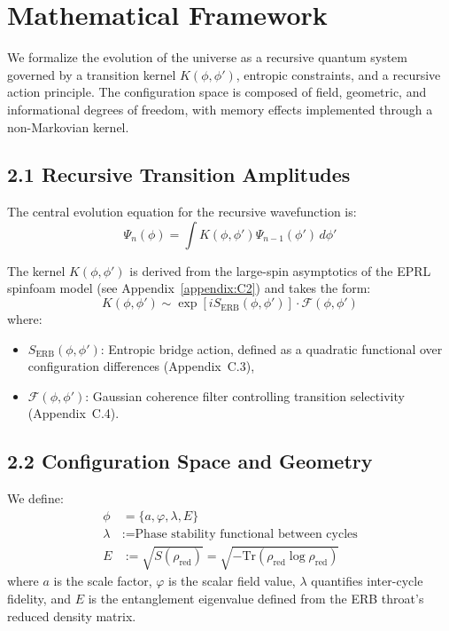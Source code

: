 \section{Mathematical Framework}
\label{sec:mathematical-framework}

We formalize the evolution of the universe as a recursive quantum system governed by a transition kernel \( K(\phi, \phi') \), entropic constraints, and a recursive action principle. The configuration space is composed of field, geometric, and informational degrees of freedom, with memory effects implemented through a non-Markovian kernel.

\subsection{2.1 Recursive Transition Amplitudes}

The central evolution equation for the recursive wavefunction is:
\begin{equation}
\Psi_n(\phi) = \int K(\phi, \phi') \Psi_{n-1}(\phi') \, d\phi'
\end{equation}

The kernel \( K(\phi, \phi') \) is derived from the large-spin asymptotics of the EPRL spinfoam model (see Appendix~\ref{appendix:C2}) and takes the form:
\begin{equation}
K(\phi, \phi') \sim \exp\left[i S_{\text{ERB}}(\phi, \phi')\right] \cdot \mathcal{F}(\phi, \phi')
\end{equation}
where:
\begin{itemize}
    \item \( S_{\text{ERB}}(\phi, \phi') \): Entropic bridge action, defined as a quadratic functional over configuration differences (Appendix~C.3),
    \item \( \mathcal{F}(\phi, \phi') \): Gaussian coherence filter controlling transition selectivity (Appendix~C.4).
\end{itemize}

\subsection{2.2 Configuration Space and Geometry}

We define:
\begin{align}
\phi &= \{a, \varphi, \lambda, E\} \\
\lambda &:= \text{Phase stability functional between cycles} \\
E &:= \sqrt{S(\rho_{\text{red}})} = \sqrt{-\mathrm{Tr}(\rho_{\text{red}} \log \rho_{\text{red}})}
\end{align}
where \( a \) is the scale factor, \( \varphi \) is the scalar field value, \( \lambda \) quantifies inter-cycle fidelity, and \( E \) is the entanglement eigenvalue defined from the ERB throat's reduced density matrix.

